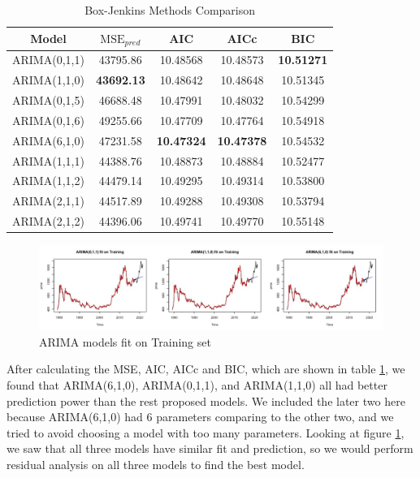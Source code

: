 \documentclass[paper=letter, fontsize=11pt]{scrartcl}
\begin{document}
\begin{table}[ht]
    \centering
    \begin{tabular}{|c|c|c|c|c|}
     \hline
      Model  &  $\mathrm{MSE}_{pred}$ &  AIC &  AICc &   BIC \\
      \hline\hline
ARIMA(0,1,1)& 43795.86& 10.48568& 10.48573& \textbf{10.51271} \\
ARIMA(1,1,0)& \textbf{43692.13}& 10.48642& 10.48648& 10.51345 \\
ARIMA(0,1,5)& 46688.48& 10.47991& 10.48032& 10.54299 \\
ARIMA(0,1,6)& 49255.66& 10.47709& 10.47764& 10.54918 \\
ARIMA(6,1,0)& 47231.58& \textbf{10.47324}& \textbf{10.47378}& 10.54532 \\
ARIMA(1,1,1)& 44388.76& 10.48873& 10.48884& 10.52477 \\
ARIMA(1,1,2)& 44479.14& 10.49295& 10.49314& 10.53800 \\
ARIMA(2,1,1)& 44517.89& 10.49288& 10.49308& 10.53794 \\
ARIMA(2,1,2)& 44396.06& 10.49741& 10.49770& 10.55148 \\
\hline
    \end{tabular}
    \caption{Box-Jenkins Methods Comparison}
    \label{tab:bj_comp}
\end{table}
\begin{figure}[ht]
    \centering
    \includegraphics[width=\linewidth]{Image/arima-fit-comp.jpeg}
    \caption{ARIMA models fit on Training set}
    \label{fig:arima-fit-train}
\end{figure}

After calculating the MSE, AIC, AICc and BIC, which are shown in table \ref{tab:bj_comp}, we found that ARIMA(6,1,0), ARIMA(0,1,1), and ARIMA(1,1,0) all had better prediction power than the rest proposed models. We included the later two here because ARIMA(6,1,0) had 6 parameters comparing to the other two, and we tried to avoid choosing a model with too many parameters.
Looking at figure \ref{fig:arima-fit-train}, we saw that all three models have similar fit and prediction, so we would perform residual analysis on all three models to find the best model.
\end{document}
